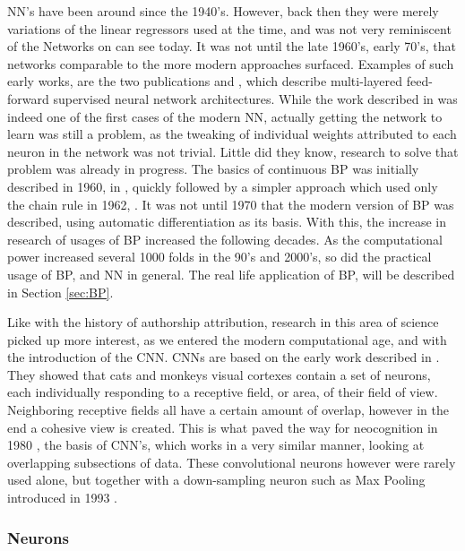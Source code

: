 \gls{NN}'s have been around since the 1940's. However, back then they
were merely variations of the linear regressors used at the time, and
was not very reminiscent of the Networks on can see today. It was not
until the late 1960's, early 70's, that networks comparable to the more
modern approaches surfaced. Examples of such early works, are the two
publications \citet{ivakhnenko1973cybernetic} and \citet{4308320}, which
describe multi-layered feed-forward supervised neural network architectures.
While the work described in \citet{4308320} was indeed one of the first cases
of the modern \gls{NN}, actually getting the network to learn was still a
problem, as the tweaking of individual weights attributed to each neuron in the
network was not trivial. Little did they know, research to solve that problem
was already in progress. The basics of continuous \gls{BP} was initially
described in 1960, in \citet{Kelley1960}, quickly followed by a simpler
approach which used only the chain rule in 1962, \citet{DREYFUS196230}. It
was not until 1970 that the modern version of \gls{BP} was described, using
automatic differentiation as its basis. With this, the increase in research of
usages of \gls{BP} increased the following decades. As the computational power
increased several 1000 folds in the 90's and 2000's, so did the practical usage
of \gls{BP}, and \gls{NN} in general\citet{Schmidhuber:2015}. The real life
application of \gls{BP}, will be described in Section \ref{sec:BP}.

Like with the history of authorship attribution, research in this area of
science picked up more interest, as we entered the modern computational
age, and with the introduction of the \gls{CNN}. \gls{CNN}s are based on
the early work described in \citet{TJP:TJP19681951215}. They showed that
cats and monkeys visual cortexes contain a set of neurons, each individually
responding to a receptive field, or area, of their field of view. Neighboring
receptive fields all have a certain amount of overlap, however in the end
a cohesive view is created. This is what paved the way for neocognition in
1980 \citet{Fukushima1980}, the basis of \gls{CNN}'s, which works in a very
similar manner, looking at overlapping subsections of data. These convolutional
neurons however were rarely used alone, but together with a down-sampling neuron
such as Max Pooling introduced in 1993 \citep{Schmidhuber:2015}.


\subsubsection{Neurons}\label{sec:neurons}

